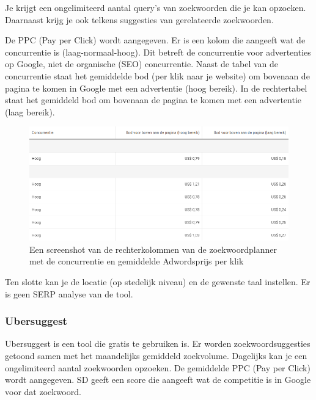 Je krijgt een ongelimiteerd aantal query's van zoekwoorden die je kan opzoeken. Daarnaast krijg je ook telkens suggesties van gerelateerde zoekwoorden. 

De PPC (Pay per Click) wordt aangegeven. Er is een kolom die aangeeft wat de concurrentie is (laag-normaal-hoog). Dit betreft de concurrentie voor advertenties op Google, niet de organische (SEO) concurrentie. Naast de tabel van de concurrentie staat het gemiddelde bod (per klik naar je website) om bovenaan de pagina te komen in Google met een advertentie (hoog bereik). In de rechtertabel staat het gemiddeld bod om bovenaan de pagina te komen met een advertentie (laag bereik). 

\begin{figure}[h!]
\centering
\includegraphics[width=\linewidth]{Bachelorproef/bachelor/img/Zoekwoordplannercon.PNG}
\caption{Een screenshot van de rechterkolommen van de zoekwoordplanner met de concurrentie en gemiddelde Adwordsprijs per klik \autocite{google.be}}
\end{figure}

Ten slotte kan je de locatie (op stedelijk niveau) en de gewenste taal instellen. Er is geen SERP analyse van de tool.

\subsubsection{Ubersuggest}
\label{ch: Ubersuggest}

Ubersuggest is een tool die gratis te gebruiken is. Er worden zoekwoordsuggesties getoond samen met het maandelijks gemiddeld zoekvolume. Dagelijks kan je een ongelimiteerd aantal zoekwoorden opzoeken. De gemiddelde PPC (Pay per Click) wordt aangegeven. SD geeft een score die aangeeft wat de competitie is in Google voor dat zoekwoord. 

